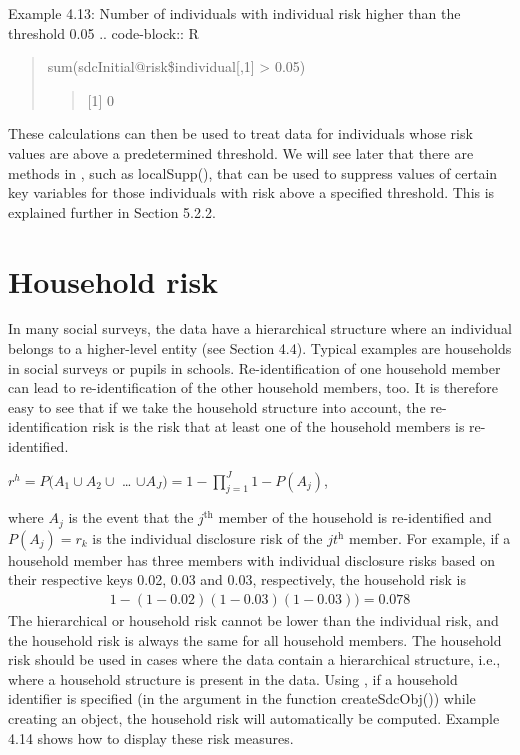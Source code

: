 \documentclass[letterpaper,10pt,english]{sphinxmanual}
\begin{document}
Example 4.13: Number of individuals with individual risk higher than the threshold 0.05
.. code-block:: R
\begin{quote}

sum(sdcInitial@risk\$individual{[},1{]} \textgreater{} 0.05)
\begin{quote}

{[}1{]} 0
\end{quote}
\end{quote}

These calculations can then be used to treat data for individuals whose
risk values are above a predetermined threshold. We will see later that
there are methods in , such as localSupp(), that can be used
to suppress values of certain key variables for those individuals with
risk above a specified threshold. This is explained further in Section
5.2.2.


\section{Household risk}
\label{\detokenize{measure_risk:household-risk}}
In many social surveys, the data have a hierarchical structure where an
individual belongs to a higher-level entity (see Section 4.4). Typical
examples are households in social surveys or pupils in schools.
Re-identification of one household member can lead to re-identification
of the other household members, too. It is therefore easy to see that if
we take the household structure into account, the re-identification risk
is the risk that at least one of the household members is re-identified.

\(r^{h} = P(A_{1} \cup A_{2} \cup\) …
\(\cup A_{J}) = 1 - \prod_{j = 1}^{J}{1 - P(A_{j})}\),

where \(A_{j}\) is the event that the \(j\)$^{\text{th}}$ member of
the household is re-identified and \(P\left( A_{j} \right) = r_{k}\)
is the individual disclosure risk of the \(jt\)$^{\text{h}}$ member.
For example, if a household member has three members with individual
disclosure risks based on their respective keys 0.02, 0.03 and 0.03,
respectively, the household risk is
\begin{equation*}
\begin{split}1 - (1 - 0.02)(1 - 0.03)(1 - 0.03)) = 0.078\end{split}
\end{equation*}
The hierarchical or household risk cannot be lower than the individual
risk, and the household risk is always the same for all household
members. The household risk should be used in cases where the data
contain a hierarchical structure, i.e., where a household structure is
present in the data. Using , if a household identifier is
specified (in the argument  in the function createSdcObj()) while
creating an  object, the household risk will automatically be
computed. Example 4.14 shows how to display these risk measures.
\end{document}
